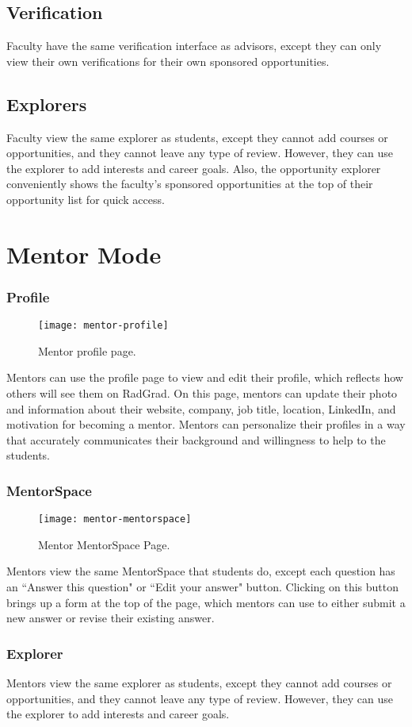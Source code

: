 \subsection{Verification}
Faculty have the same verification interface as advisors, except they can only view their own verifications for their own sponsored opportunities. 
\subsection{Explorers}
Faculty view the same explorer as students, except they cannot add courses or opportunities, and they cannot leave any type of review. However, they can use the explorer to add interests and career goals. Also, the opportunity explorer conveniently shows the faculty's sponsored opportunities at the top of their opportunity list for quick access.

\section{Mentor Mode}
\subsubsection{Profile}
\begin{figure}[htbp!]
\centering
\texttt{[image: mentor-profile]}
\caption{Mentor profile page.}
\end{figure}
Mentors can use the profile page to view and edit their profile, which reflects how others will see them on RadGrad. On this page, mentors can update their photo and information about their website, company, job title, location, LinkedIn, and motivation for becoming a mentor. Mentors can personalize their profiles in a way that accurately communicates their background and willingness to help to the students. 
\subsubsection{MentorSpace}
\begin{figure}[htbp!]
\centering
\texttt{[image: mentor-mentorspace]}
\caption{Mentor MentorSpace Page.}
\end{figure}
Mentors view the same MentorSpace that students do, except each question has an ``Answer this question" or ``Edit your answer" button. Clicking on this button brings up a form at the top of the page, which mentors can use to either submit a new answer or revise their existing answer. 
\subsubsection{Explorer}
Mentors view the same explorer as students, except they cannot add courses or opportunities, and they cannot leave any type of review. However, they can use the explorer to add interests and career goals.

